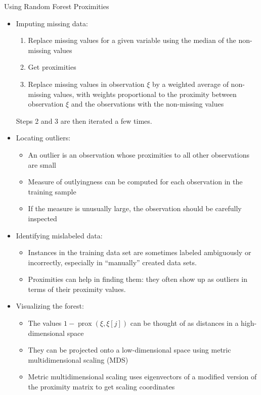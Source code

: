 \documentclass[11pt,compress,t,notes=noshow, xcolor=table]{beamer}
\begin{document}
\begin{vbframe}{Using Random Forest Proximities}

\begin{itemize}
\item Imputing missing data:
\begin{enumerate}
\item Replace missing values for a given variable using the median of the non-missing values
\item Get proximities
\item Replace missing values in observation $\xi$ by a weighted average of non-missing values, with weights proportional to the proximity between observation $\xi$ and the observations with the non-missing values
\end{enumerate}
Steps 2 and 3 are then iterated a few times. %

\item Locating outliers: 
\begin{itemize}
\item An outlier is an observation whose proximities to all other observations are small
\item Measure of outlyingness can be computed for each observation in the training sample
\item If the measure is unusually large, the observation should be carefully inspected
\end{itemize}


\item Identifying mislabeled data:
\begin{itemize}
\item Instances in the training data set are sometimes labeled ambiguously or incorrectly, especially in \enquote{manually} created data sets.
\item Proximities can help in finding them: they often show up as outliers in terms of their proximity values. 
\end{itemize}


\item Visualizing the forest: 
\begin{itemize}
\item The values $1 - \operatorname{prox}\left(\xi, \xi[j]\right)$ can be thought of as distances in a high-dimensional space
\item They can be projected onto a low-dimensional space using metric multidimensional scaling (MDS)
\item Metric multidimensional scaling uses eigenvectors of a modified version of the proximity matrix to get scaling coordinates
\end{itemize}
\end{itemize}


\end{vbframe}
\end{document}
